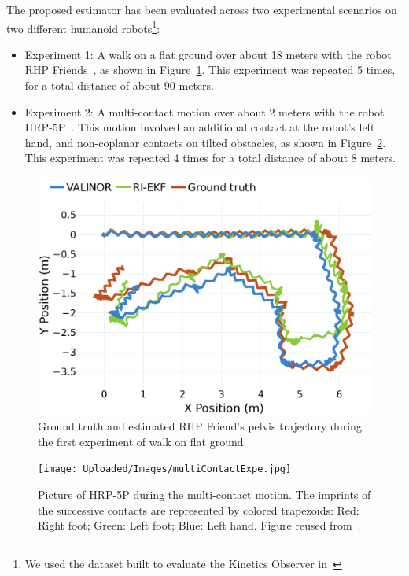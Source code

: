 \documentclass{IJCAS}
\begin{document}
The proposed estimator has been evaluated across two experimental scenarios on two different humanoid robots\footnote{We used the dataset built to evaluate the Kinetics Observer in~\cite{Demont2024KineticsObserver}}:
\begin{itemize}
    \item Experiment 1: A walk on a flat ground over about 18 meters with the robot RHP Friends~\cite{Benallegue2025RhpFriendsJRL}, as shown in Figure~\ref{fig:trajRhps1}. This experiment was repeated 5 times, for a total distance of about 90 meters.
    \item Experiment 2: A multi-contact motion over about 2 meters with the robot HRP-5P~\cite{Kaneko2019Hrp5}. This motion involved an additional contact at the robot's left hand, and non-coplanar contacts on tilted obstacles, as shown in Figure~\ref{fig:hrp5_multicontact}. This experiment was repeated 4 times for a total distance of about 8 meters.
\end{itemize}


\begin{figure}[!ht]
\begin{center}
\includegraphics[width=\columnwidth]{Uploaded/Images/trajectory_rhps1.pdf} 
\vskip -0.5pc
\caption{Ground truth and estimated RHP Friend's pelvis trajectory during the first experiment of walk on flat ground.}\label{fig:trajRhps1}
\end{center}
\vskip -1.5pc
\end{figure}

\begin{figure}[!ht]
\begin{center}
\texttt{[image: Uploaded/Images/multiContactExpe.jpg]} 
\vskip -0.5pc
\caption{Picture of HRP-5P during the multi-contact motion. The imprints of the successive contacts are represented by colored trapezoids: Red: Right foot; Green: Left foot; Blue: Left hand. Figure reused from~\cite{Demont2024KineticsObserver}.}\label{fig:hrp5_multicontact}
\end{center}
\vskip -1.5pc
\end{figure}
\end{document}
